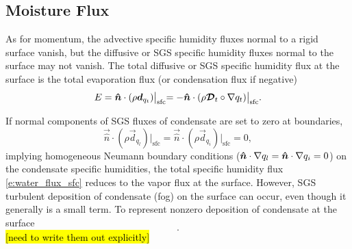 \documentclass{report}
\begin{document}
\subsection{Moisture Flux}\label{s:bc_moisture_flux}

As for momentum, the advective specific humidity fluxes normal to a rigid surface vanish, but the diffusive or SGS specific humidity fluxes normal to the surface may not vanish.  The total diffusive or SGS specific humidity flux at the surface is the total evaporation flux (or condensation flux if negative)
\begin{equation}\label{e:water_flux_sfc}
E = \boldsymbol{{\hat n}} \cdot (\rho \boldsymbol{{d}}_{q_{t}})\bigl|_\mathrm{sfc} = -\boldsymbol{{\hat n}} \cdot (\rho \boldsymbol{{\mathcal{D}}}_t \circ \nabla q_t)\bigl|_\mathrm{sfc}.
\end{equation}

If normal components of SGS fluxes of condensate are set to zero at boundaries,
\[
\vec{\hat n} \cdot (\rho \vec{d}_{q_{l}})\bigl|_\mathrm{sfc} = \vec{\hat n} \cdot (\rho \vec{d}_{q_{i}})\bigl|_\mathrm{sfc} = 0,
\]
implying homogeneous Neumann boundary conditions ($\boldsymbol{{\hat n}}\cdot\nabla q_l = \boldsymbol{{\hat n}}\cdot\nabla q_i = 0$) on the condensate specific humidities, the total specific humidity flux \eqref{e:water_flux_sfc} reduces to the vapor flux at the surface. However, SGS turbulent deposition of condensate (fog) on the surface can occur, even though it generally is a small term. To represent nonzero deposition of condensate at the surface
\begin{equation}\label{e:sfc_condensate_flux}
.
\end{equation}
\hl{[need to write them out explicitly]}
\end{document}
